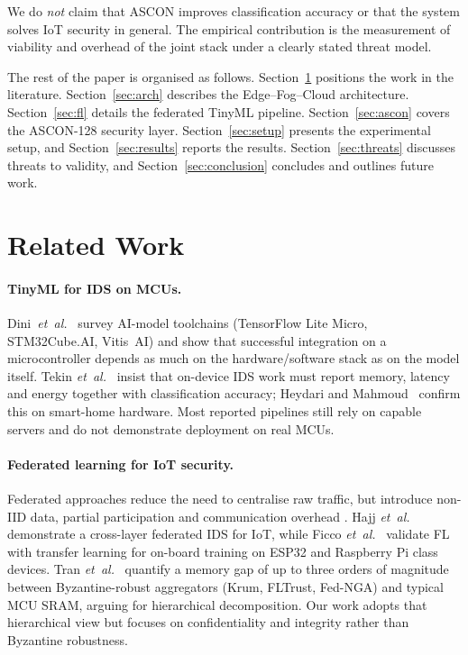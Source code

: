 \documentclass[runningheads]{llncs}
\begin{document}
We do \emph{not} claim that ASCON improves classification accuracy or that
the system solves IoT security in general. The empirical contribution is
the measurement of viability and overhead of the joint stack under a
clearly stated threat model.

The rest of the paper is organised as follows. Section~\ref{sec:related}
positions the work in the literature. Section~\ref{sec:arch} describes the
Edge--Fog--Cloud architecture. Section~\ref{sec:fl} details the federated
TinyML pipeline. Section~\ref{sec:ascon} covers the ASCON-128 security
layer. Section~\ref{sec:setup} presents the experimental setup, and
Section~\ref{sec:results} reports the results. Section~\ref{sec:threats}
discusses threats to validity, and Section~\ref{sec:conclusion} concludes
and outlines future work.

\section{Related Work}
\label{sec:related}

\paragraph{TinyML for IDS on MCUs.}
Dini~\textit{et~al.}~\cite{dini2024embedded} survey AI-model toolchains
(TensorFlow Lite Micro, STM32Cube.AI, Vitis~AI) and show that successful
integration on a microcontroller depends as much on the
hardware/software stack as on the model itself. Tekin
\textit{et~al.}~\cite{tekin2023energy} insist that on-device IDS work must
report memory, latency and energy together with classification accuracy;
Heydari and Mahmoud~\cite{heydari2025tinyml} confirm this on smart-home
hardware. Most reported pipelines still rely on capable servers and do not
demonstrate deployment on real MCUs.

\paragraph{Federated learning for IoT security.}
Federated approaches reduce the need to centralise raw traffic, but
introduce non-IID data, partial participation and communication overhead
\cite{imteaj2022survey,albanbay2025,roy2023adapted}. Hajj
\textit{et~al.}~\cite{hajj2023crosslayer} demonstrate a cross-layer
federated IDS for IoT, while Ficco \textit{et~al.}~\cite{ficco2024fl}
validate FL with transfer learning for on-board training on ESP32 and
Raspberry Pi class devices. Tran \textit{et~al.}~\cite{tran2026edgetrust}
quantify a memory gap of up to three orders of magnitude between
Byzantine-robust aggregators (Krum, FLTrust, Fed-NGA) and typical MCU SRAM,
arguing for hierarchical decomposition. Our work adopts that hierarchical
view but focuses on confidentiality and integrity rather than Byzantine
robustness.
\end{document}
